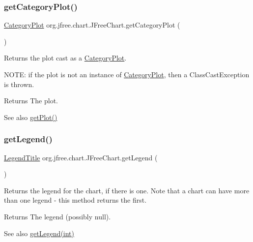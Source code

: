 \subsubsection{\texorpdfstring{get\+Category\+Plot()}{getCategoryPlot()}}
{\footnotesize\ttfamily \mbox{\hyperlink{classorg_1_1jfree_1_1chart_1_1plot_1_1_category_plot}{Category\+Plot}} org.\+jfree.\+chart.\+J\+Free\+Chart.\+get\+Category\+Plot (\begin{DoxyParamCaption}{ }\end{DoxyParamCaption})}

Returns the plot cast as a \mbox{\hyperlink{}{Category\+Plot}}. 

N\+O\+TE\+: if the plot is not an instance of \mbox{\hyperlink{}{Category\+Plot}}, then a {\ttfamily Class\+Cast\+Exception} is thrown.

\begin{DoxyReturn}{Returns}
The plot.
\end{DoxyReturn}
\begin{DoxySeeAlso}{See also}
\mbox{\hyperlink{classorg_1_1jfree_1_1chart_1_1_j_free_chart_aac70289d4ca81df3434b476f54286ee7}{get\+Plot()}} 
\end{DoxySeeAlso}
\mbox{\label{classorg_1_1jfree_1_1chart_1_1_j_free_chart_a761aca9a3ee1c8198e055aa03c77a980}} 
\subsubsection{\texorpdfstring{get\+Legend()}{getLegend()}\hspace{0.1cm}{\footnotesize\ttfamily [1/2]}}
{\footnotesize\ttfamily \mbox{\hyperlink{classorg_1_1jfree_1_1chart_1_1title_1_1_legend_title}{Legend\+Title}} org.\+jfree.\+chart.\+J\+Free\+Chart.\+get\+Legend (\begin{DoxyParamCaption}{ }\end{DoxyParamCaption})}

Returns the legend for the chart, if there is one. Note that a chart can have more than one legend -\/ this method returns the first.

\begin{DoxyReturn}{Returns}
The legend (possibly {\ttfamily null}).
\end{DoxyReturn}
\begin{DoxySeeAlso}{See also}
\mbox{\hyperlink{classorg_1_1jfree_1_1chart_1_1_j_free_chart_a9ebd675579af1cd17f65d6bbfa274aac}{get\+Legend(int)}} 
\end{DoxySeeAlso}
\mbox{\label{classorg_1_1jfree_1_1chart_1_1_j_free_chart_a9ebd675579af1cd17f65d6bbfa274aac}} 
